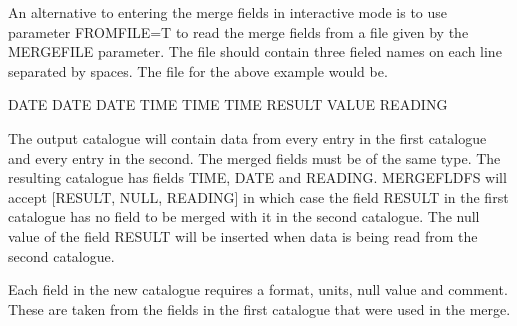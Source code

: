 \begin{small}
{{      An alternative to entering the merge fields in interactive mode is to
      use parameter FROMFILE=T to read the merge fields from a file given
      by the MERGEFILE parameter. The file should contain three fieled names
      on each line separated by spaces. The file for the above example would
      be.

      DATE DATE DATE
      TIME TIME TIME
      RESULT VALUE READING

      The output catalogue will contain
      data from every entry in the first catalogue and every entry in the
      second. The merged fields must be of the same type.
      The resulting catalogue has fields TIME, DATE and READING.
      MERGEFLDFS will accept [RESULT, NULL, READING] in which case the field
      RESULT in the first catalogue has no field to be merged with it in the
      second catalogue. The null value of the field RESULT will be inserted
      when data is being read from the second catalogue.

      Each field in the new catalogue requires a format, units, null value and
      comment. These are taken from the fields in the first catalogue that were
      used in the merge.

}}
\end{small}

